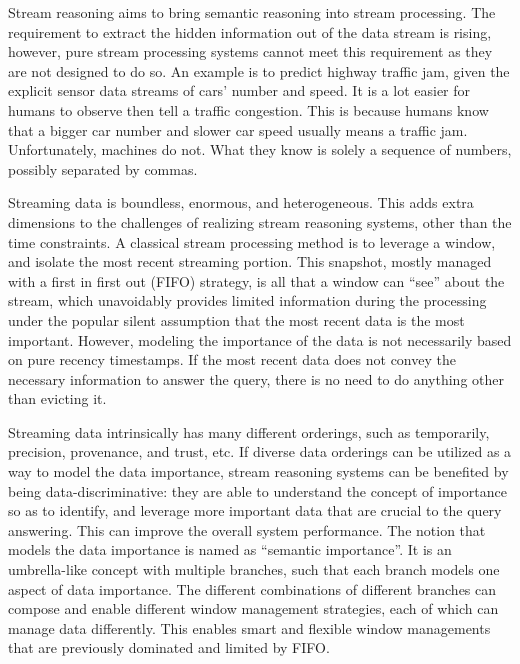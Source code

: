 

Stream reasoning aims to bring semantic reasoning into stream processing. 
The requirement to extract the hidden information out of the data stream is rising, 
however, pure stream processing systems cannot meet this requirement as they are not designed to do so.  
An example is to predict highway traffic jam, given the explicit sensor data streams of cars' number and speed.
It is a lot easier for humans to observe then tell a traffic congestion.
This is because humans know that a bigger car number and slower car speed usually means a traffic jam. 
Unfortunately, machines do not.
What they know is solely a sequence of numbers, possibly separated by commas.

Streaming data is boundless, enormous, and heterogeneous.
This adds extra dimensions to the challenges of realizing stream reasoning systems, other than the time constraints.
A classical stream processing method is to leverage a window, and isolate the most recent streaming portion. 
This snapshot, mostly managed with a first in first out (FIFO) strategy, is all that a window can ``see'' about the stream, 
which unavoidably provides limited information during the processing under the popular silent assumption that the most recent data is the most important.
However, modeling the importance of the data is not necessarily based on pure recency timestamps. 
If the most recent data does not convey the necessary information to answer the query, there is no need to do anything other than evicting it. 

Streaming data intrinsically has many different orderings, such as temporarily, precision, provenance, and trust, etc.
If diverse data orderings can be utilized as a way to model the data importance, stream reasoning systems can be benefited by being data-discriminative: 
they are able to understand the concept of importance so as to identify, and leverage more important data that are crucial to the query answering.
This can improve the overall system performance.
The notion that models the data importance is named as ``semantic importance''.
It is an umbrella-like concept with multiple branches, such that each branch models one aspect of data importance.
The different combinations of different branches can compose and enable different window management strategies, each of which can manage data differently. 
This enables smart and flexible window managements that are previously dominated and limited by FIFO.

